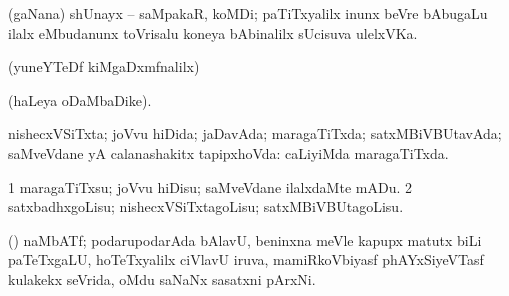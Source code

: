 \bentry
{}
\gl{\nA}
\bmng
(gaNana) shUnayx -- saMpakaR, koMDi; paTiTxyalilx inunx beVre bAbugaLu ilalx eMbudanunx toVrisalu koneya bAbinalilx sUcisuva ulelxVKa. 
\emng
\eentry

\bentry
{}
\gl{\saMkiSx}
\bmng
(yuneYTeDf kiMgaDxmfnalilx)  
\emng
\eentry

\bentry
{}
\gl{\saMkiSx}
\bmng
{}(haLeya oDaMbaDike). 
\emng
\eentry

\bentry
{}
\gl{\gu}
\bmng
nishecxVSiTxta; joVvu hiDida; jaDavAda; maragaTiTxda; satxMBiVBUtavAda; saMveVdane yA calanashakitx tapipxhoVda:  caLiyiMda maragaTiTxda. 
\emng
\eentry

\bentry
{}
\gl{\saMkiSx}
\bmng
\bnum
\num{1} maragaTiTxsu; joVvu hiDisu; saMveVdane ilalxdaMte mADu. 
\num{2} satxbadhxgoLisu; nishecxVSiTxtagoLisu; satxMBiVBUtagoLisu. 
\enum
\emng
\eentry

\bentry
{}
\gl{\nA}
\bmng
(\AseTxrXV) naMbATf; podarupodarAda bAlavU, beninxna meVle kapupx matutx biLi paTeTxgaLU, hoTeTxyalilx ciVlavU iruva, mamiRkoVbiyasf phAYxSiyeVTasf kulakekx seVrida, oMdu saNaNx sasatxni pArxNi. 
\emng
\eentry

